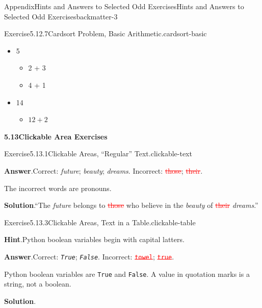 \documentclass[oneside,10pt,]{book}
\newcommand{\blocktitlefont}{\relax}
\newcommand{\mono}[1]{\texttt{#1}}
\newcommand{\deletethick}{.25ex}
\newcommand{\deleted}[1]{\renewcommand{\ULthickness}{\deletethick}\textcolor{red}{\sout{#1}}}
\numberwithin{equation}{section}
\begin{document}
\begin{solutions-chapter}{Appendix}{Hints and Answers to Selected Odd Exercises}{}{Hints and Answers to Selected Odd Exercises}{}{}{backmatter-3}
\begin{divisionsolution}{Exercise}{5.12.7}{Cardsort Problem, Basic Arithmetic.}{cardsort-basic}
\begin{itemize}[label=\textbullet]
\item{}5%
\begin{itemize}[label=$\circ$]
\item{}2 + 3%
\item{}4 + 1%
\end{itemize}
%
\item{}14%
\begin{itemize}[label=$\circ$]
\item{}\(12 + 2\)%
\end{itemize}
%
\end{itemize}
%
\end{divisionsolution}%
\par\medskip
\noindent\textbf{\Large{}5.13\space\textperiodcentered\space{}Clickable Area Exercises}
\begin{divisionsolution}{Exercise}{5.13.1}{Clickable Areas, ``Regular'' Text.}{clickable-text}%
\par\smallskip%
\noindent\textbf{\blocktitlefont Answer}.\hypertarget{clickable-text-3-back}{}\quad{}Correct: \emph{future}; \emph{beauty}; \emph{dreams}. Incorrect: \deleted{those}; \deleted{their}.%
\par
The incorrect words are pronouns.%
\par\smallskip%
\noindent\textbf{\blocktitlefont Solution}.\hypertarget{clickable-text-4-back}{}\quad{}``The \emph{future} belongs to \deleted{those} who believe in the \emph{beauty} of \deleted{their} \emph{dreams}.''%
\end{divisionsolution}%
\begin{divisionsolution}{Exercise}{5.13.3}{Clickable Areas, Text in a Table.}{clickable-table}%
\par\smallskip%
\noindent\textbf{\blocktitlefont Hint}.\hypertarget{clickable-table-3-back}{}\quad{}Python boolean variables begin with capital latters.%
\par\smallskip%
\noindent\textbf{\blocktitlefont Answer}.\hypertarget{clickable-table-4-back}{}\quad{}Correct: \emph{\mono{True}}; \emph{\mono{False}}. Incorrect: \deleted{\mono{\textquotesingle{}towel\textquotesingle{}}}; \deleted{\mono{\textquotesingle{}true\textquotesingle{}}}.%
\par
Python boolean variables are \mono{True} and \mono{False}.  A value in quotation marks is a string, not a boolean.%
\par\smallskip%
\noindent\textbf{\blocktitlefont Solution}.\hypertarget{clickable-table-5-back}{}\quad{}\begin{center}%

\end{center}
\end{divisionsolution}
\end{solutions-chapter}
\end{document}
